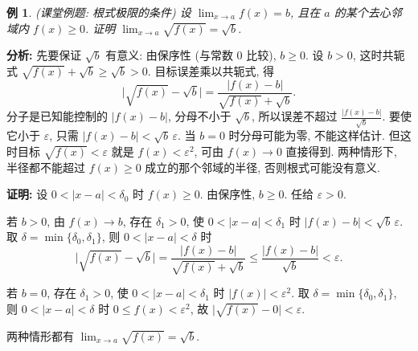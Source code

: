 \documentclass[UTF8,openany]{ctexbook}
\theoremstyle{chinesetextbook}
\newtheorem{example}{例}[section]
\newenvironment{cnproof}{\par\indent\textbf{证明:} \ignorespaces}{\par}
\begin{document}
\begin{example}\label{ex:k16-1}
\textnormal{(课堂例题: 根式极限的条件)} 设 $\displaystyle\lim_{x\to a}f(x)=b$, 且在 $a$ 的某个去心邻域内 $f(x)\ge0$. 证明 $\displaystyle\lim_{x\to a}\sqrt{f(x)}=\sqrt b$.
\end{example}
\par\indent\textbf{分析:} 先要保证 $\sqrt b$ 有意义: 由保序性 (与常数 $0$ 比较), $b\ge0$. 设 $b>0$, 这时共轭式 $\sqrt{f(x)}+\sqrt b\ge\sqrt b>0$. 目标误差乘以共轭式, 得
\[
\bigl|\sqrt{f(x)}-\sqrt b\bigr|=\frac{|f(x)-b|}{\sqrt{f(x)}+\sqrt b}.
\]
分子是已知能控制的 $|f(x)-b|$, 分母不小于 $\sqrt b$, 所以误差不超过 $\displaystyle\frac{|f(x)-b|}{\sqrt b}$. 要使它小于 $\varepsilon$, 只需 $|f(x)-b|<\sqrt b\,\varepsilon$. 当 $b=0$ 时分母可能为零, 不能这样估计. 但这时目标 $\sqrt{f(x)}<\varepsilon$ 就是 $f(x)<\varepsilon^2$, 可由 $f(x)\to0$ 直接得到. 两种情形下, 半径都不能超过 $f(x)\ge0$ 成立的那个邻域的半径, 否则根式可能没有意义.
\begin{cnproof}
设 $0<|x-a|<\delta_0$ 时 $f(x)\ge0$. 由保序性, $b\ge0$. 任给 $\varepsilon>0$.

若 $b>0$, 由 $f(x)\to b$, 存在 $\delta_1>0$, 使 $0<|x-a|<\delta_1$ 时 $|f(x)-b|<\sqrt b\,\varepsilon$. 取 $\delta=\min\{\delta_0,\delta_1\}$, 则 $0<|x-a|<\delta$ 时
\[
\bigl|\sqrt{f(x)}-\sqrt b\bigr|=\frac{|f(x)-b|}{\sqrt{f(x)}+\sqrt b}\le\frac{|f(x)-b|}{\sqrt b}<\varepsilon.
\]

若 $b=0$, 存在 $\delta_1>0$, 使 $0<|x-a|<\delta_1$ 时 $|f(x)|<\varepsilon^2$. 取 $\delta=\min\{\delta_0,\delta_1\}$, 则 $0<|x-a|<\delta$ 时 $0\le f(x)<\varepsilon^2$, 故 $\bigl|\sqrt{f(x)}-0\bigr|<\varepsilon$.

两种情形都有 $\displaystyle\lim_{x\to a}\sqrt{f(x)}=\sqrt b$.
\end{cnproof}
\end{document}
